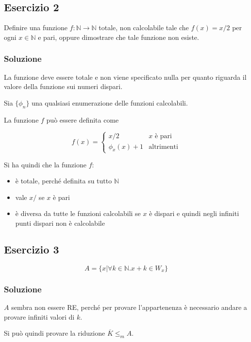 \subsection{Esercizio 2}

Definire una funzione $f : \mathbb{N} \rightarrow \mathbb{N}$ totale, non calcolabile tale che $f(x) = x/2$ per ogni $x \in \mathbb{N}$ e pari, oppure dimostrare che tale funzione non esiste.

\subsubsection{Soluzione}

La funzione deve essere totale e non viene specificato nulla per quanto riguarda il valore della funzione sui numeri dispari.

Sia $\{ \phi_n \}$ una qualsiasi enumerazione delle funzioni calcolabili.

La funzione $f$ può essere definita come 

$$
f(x) = \begin{cases}
x/2 &x \text{ è pari} \\
\phi_x(x)+1 &\text{altrimenti}
\end{cases}
$$

Si ha quindi che la funzione $f$:
\begin{itemize}
	\item è totale, perché definita su tutto $\mathbb{N}$
	\item vale $x/$ se $x$ è pari
	\item è diversa da tutte le funzioni calcolabili se $x$ è dispari e quindi negli infiniti punti dispari non è calcolabile
\end{itemize}

\subsection{Esercizio 3}

$$
A = \{ x | \forall k \in \mathbb{N} . x +k \in W_x \}
$$

\subsubsection{Soluzione}

$A$ sembra non essere RE, perché per provare l'appartenenza è necessario andare a provare infiniti valori di $k$.

Si può quindi provare la riduzione $\overline{K} \leq_m A$.

